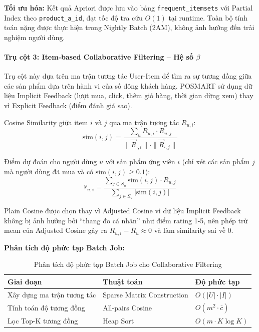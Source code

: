 \documentclass[12pt,a4paper]{report}
\begin{document}
\textbf{Tối ưu hóa:} Kết quả Apriori được lưu vào bảng \texttt{frequent\_itemsets} với Partial Index theo \texttt{product\_a\_id}, đạt tốc độ tra cứu $O(1)$ tại runtime. Toàn bộ tính toán nặng được thực hiện trong Nightly Batch (2AM), không ảnh hưởng đến trải nghiệm người dùng.
 
\paragraph{Trụ cột 3: Item-based Collaborative Filtering -- Hệ số $\beta$}
 
Trụ cột này dựa trên ma trận tương tác User-Item để tìm ra sự tương đồng giữa các sản phẩm dựa trên hành vi của số đông khách hàng. POSMART sử dụng dữ liệu Implicit Feedback (lượt mua, click, thêm giỏ hàng, thời gian dừng xem) thay vì Explicit Feedback (điểm đánh giá sao).
 
Cosine Similarity giữa item $i$ và $j$ qua ma trận tương tác $R_{u,i}$:
\[
\text{sim}(i, j) = \frac{\sum_u R_{u,i} \cdot R_{u,j}}{\|\vec{R}_{\cdot,i}\| \cdot \|\vec{R}_{\cdot,j}\|}
\]
 
Điểm dự đoán cho người dùng $u$ với sản phẩm ứng viên $i$ (chỉ xét các sản phẩm $j$ mà người dùng đã mua và có $\text{sim}(i,j) \geq 0.1$):
\[
\hat{r}_{u,i} = \frac{\sum_{j \in S_u} \text{sim}(i,j) \cdot R_{u,j}}{\sum_{j \in S_u} |\text{sim}(i,j)|}
\]
 
Plain Cosine được chọn thay vì Adjusted Cosine vì dữ liệu Implicit Feedback không bị ảnh hưởng bởi ``thang đo cá nhân'' như điểm rating 1-5, nên phép trừ mean của Adjusted Cosine gây ra $R_{u,i} - \bar{R}_u \approx 0$ và làm similarity sai về 0.
 
\textbf{Phân tích độ phức tạp Batch Job:}
 
\begin{table}[htbp]
\centering
\renewcommand{\arraystretch}{1.3}
\begin{tabular}{|l|l|l|}
\hline
\rowcolor[HTML]{EFEFEF}
\textbf{Giai đoạn} & \textbf{Thuật toán} & \textbf{Độ phức tạp} \\ \hline
Xây dựng ma trận tương tác & Sparse Matrix Construction & $O(|U| \cdot |I|)$ \\ \hline
Tính toán độ tương đồng & All-pairs Cosine & $O(m^2 \cdot \overline{c})$ \\ \hline
Lọc Top-K tương đồng & Heap Sort & $O(m \cdot K \log K)$ \\ \hline
\end{tabular}
\caption{Phân tích độ phức tạp Batch Job cho Collaborative Filtering}
\end{table}
 
\end{document}
